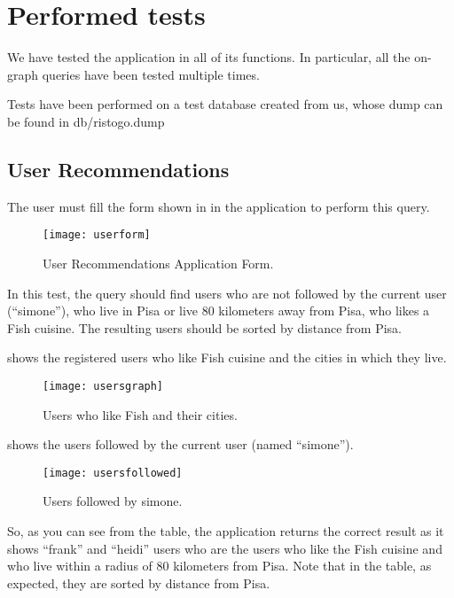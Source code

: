\chapter{Performed tests}\label{ch:tests}

We have tested the application in all of its functions. In particular, all the
on-graph queries have been tested multiple times.

Tests have been performed on a test database created from us, whose dump can be
found in db/ristogo.dump

\section{User Recommendations}

The user must fill the form shown in  in the application to
perform this query.

\begin{figure}[htb]
	\centering
	\texttt{[image: userform]}
	\caption{User Recommendations Application Form.}\label{fig:userform}
\end{figure}

In this test, the query should find users who are not followed by the current
user (``simone''), who live in Pisa or live 80 kilometers away from Pisa, who
likes a Fish cuisine. The resulting users should be sorted by distance from
Pisa.

 shows the registered users who like Fish cuisine and the
cities in which they live.

\begin{figure}[htb]%
	\centering
	\texttt{[image: usersgraph]}
	\caption{Users who like Fish and their cities.}\label{fig:usersgraph}
\end{figure}

 shows the users followed by the current user (named
``simone'').

\begin{figure}[htb]%
	\centering
	\texttt{[image: usersfollowed]}
	\caption{Users followed by simone.}\label{fig:usersfollowed}
\end{figure}

So, as you can see from the table, the application returns the correct result as
it shows ``frank'' and ``heidi'' users who are the users who like the Fish
cuisine and who live within a radius of 80 kilometers from Pisa. Note that in
the table, as expected, they are sorted by distance from Pisa.

